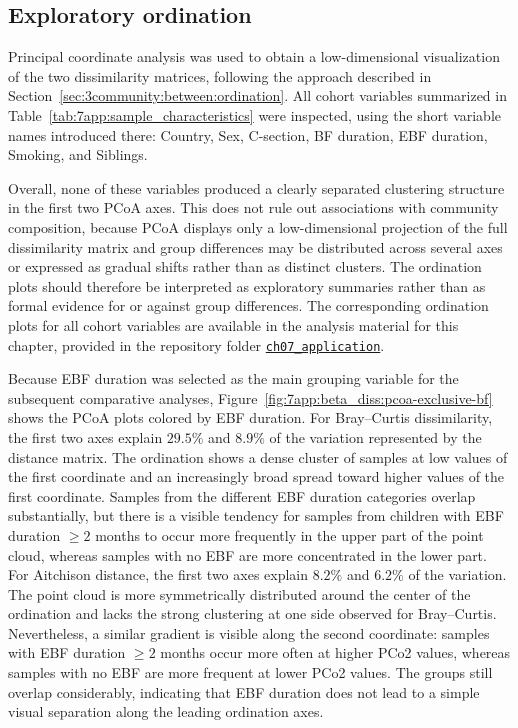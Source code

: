 \subsection{Exploratory ordination}
\label{sec:7app:beta:ordination}

Principal coordinate analysis was used to obtain a low-dimensional visualization of the two dissimilarity matrices, following the approach described in Section~\ref{sec:3community:between:ordination}. All cohort variables summarized in Table~\ref{tab:7app:sample_characteristics} were inspected, using the short variable names introduced there: Country, Sex, C-section, BF duration, EBF duration, Smoking, and Siblings.

Overall, none of these variables produced a clearly separated clustering structure in the first two PCoA axes. This does not rule out associations with community composition, because PCoA displays only a low-dimensional projection of the full dissimilarity matrix and group differences may be distributed across several axes or expressed as gradual shifts rather than as distinct clusters. The ordination plots should therefore be interpreted as exploratory summaries rather than as formal evidence for or against group differences. The corresponding ordination plots for all cohort variables are available in the analysis material for this chapter, provided in the repository folder \href{https://github.com/stefpeschel/phd_thesis/tree/main/ch07_application}{\texttt{ch07\_application}}.

Because EBF duration was selected as the main grouping variable for the subsequent comparative analyses, Figure~\ref{fig:7app:beta_diss:pcoa-exclusive-bf} shows the PCoA plots colored by EBF duration. For Bray--Curtis dissimilarity, the first two axes explain $29.5\%$ and $8.9\%$ of the variation represented by the distance matrix. The ordination shows a dense cluster of samples at low values of the first coordinate and an increasingly broad spread toward higher values of the first coordinate. Samples from the different EBF duration categories overlap substantially, but there is a visible tendency for samples from children with EBF duration $\ge 2$ months to occur more frequently in the upper part of the point cloud, whereas samples with no EBF are more concentrated in the lower part. For Aitchison distance, the first two axes explain $8.2\%$ and $6.2\%$ of the variation. The point cloud is more symmetrically distributed around the center of the ordination and lacks the strong clustering at one side observed for Bray--Curtis. Nevertheless, a similar gradient is visible along the second coordinate: samples with EBF duration $\ge 2$ months occur more often at higher PCo2 values, whereas samples with no EBF are more frequent at lower PCo2 values. The groups still overlap considerably, indicating that EBF duration does not lead to a simple visual separation along the leading ordination axes.

